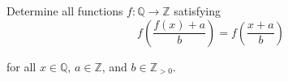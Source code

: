 Determine all functions 
$f: \mathbb{Q} \rightarrow \mathbb{Z} $
 satisfying
\[ f \left( \frac{f(x)+a} {b}\right) = f \left( \frac{x+a}{b} \right) \]


for all  
$x \in \mathbb{Q}$, $a \in \mathbb{Z}$, 
 and 
$b \in \mathbb{Z}_{>0}$.
